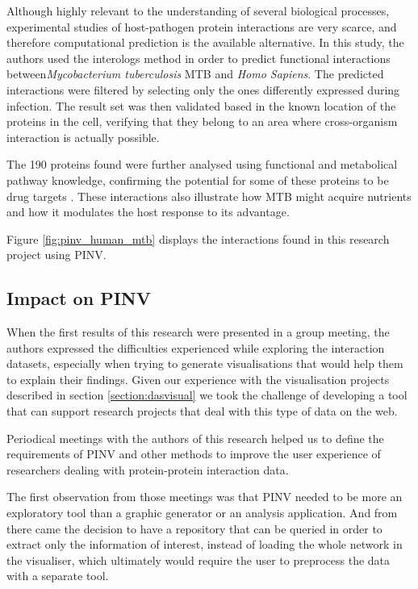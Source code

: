 Although highly relevant to the understanding of several biological processes, experimental studies of host-pathogen protein interactions are very scarce, and therefore computational prediction is the available alternative. In this study, the authors used the interologs method in order to predict functional interactions between\emph{Mycobacterium tuberculosis} MTB and \emph{Homo Sapiens}. The predicted interactions were filtered by selecting only the ones differently expressed during infection. The result set was then validated based in the known location of the proteins in the cell, verifying that they belong to an area where cross-organism interaction is actually possible. 

The 190 proteins found were further analysed using functional and metabolical pathway knowledge, confirming the potential for some of these proteins to be drug targets \cite{RAP2013}. These interactions also illustrate how MTB might acquire nutrients and how it modulates the host response to its advantage.

Figure \ref{fig:pinv_human_mtb} displays the interactions found in this research project using PINV.


\subsection{Impact on PINV}

When the first results of this research were presented in a group meeting, the authors expressed the difficulties experienced while exploring the interaction datasets, especially when trying to generate visualisations that would help them to explain their findings. Given our experience with the visualisation projects described in section \ref{section:dasvisual} we took the challenge of developing a tool that can support research projects that deal with this type of data on the web. 

Periodical meetings with the authors of this research helped us to define the requirements of PINV and other methods to improve the user experience of researchers dealing with protein-protein interaction data. 

The first observation from those meetings was that PINV needed to be more an exploratory tool than a graphic generator or an analysis application. And from there came the decision to have a repository that can be queried in order to extract only the information of interest, instead of loading the whole network in the visualiser, which ultimately would require the user to preprocess the data with a separate tool.

